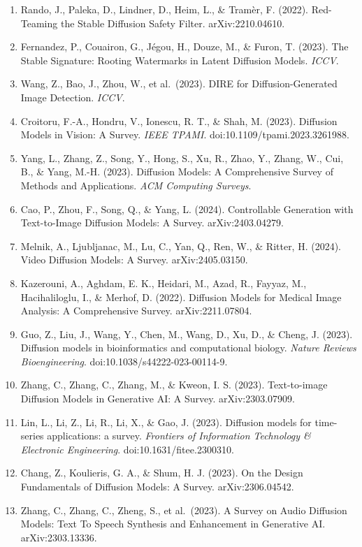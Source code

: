 \begin{enumerate}
\item
  Rando, J., Paleka, D., Lindner, D., Heim, L., \& Tramèr, F. (2022). Red-Teaming the Stable Diffusion Safety Filter. arXiv:2210.04610.
\item
  Fernandez, P., Couairon, G., Jégou, H., Douze, M., \& Furon, T. (2023). The Stable Signature: Rooting Watermarks in Latent Diffusion Models. \emph{ICCV}.
\item
  Wang, Z., Bao, J., Zhou, W., et al.~(2023). DIRE for Diffusion-Generated Image Detection. \emph{ICCV}.
\item
  Croitoru, F.-A., Hondru, V., Ionescu, R. T., \& Shah, M. (2023). Diffusion Models in Vision: A Survey. \emph{IEEE TPAMI}. doi:10.1109/tpami.2023.3261988.
\item
  Yang, L., Zhang, Z., Song, Y., Hong, S., Xu, R., Zhao, Y., Zhang, W., Cui, B., \& Yang, M.-H. (2023). Diffusion Models: A Comprehensive Survey of Methods and Applications. \emph{ACM Computing Surveys}.
\item
  Cao, P., Zhou, F., Song, Q., \& Yang, L. (2024). Controllable Generation with Text-to-Image Diffusion Models: A Survey. arXiv:2403.04279.
\item
  Melnik, A., Ljubljanac, M., Lu, C., Yan, Q., Ren, W., \& Ritter, H. (2024). Video Diffusion Models: A Survey. arXiv:2405.03150.
\item
  Kazerouni, A., Aghdam, E. K., Heidari, M., Azad, R., Fayyaz, M., Hacihaliloglu, I., \& Merhof, D. (2022). Diffusion Models for Medical Image Analysis: A Comprehensive Survey. arXiv:2211.07804.
\item
  Guo, Z., Liu, J., Wang, Y., Chen, M., Wang, D., Xu, D., \& Cheng, J. (2023). Diffusion models in bioinformatics and computational biology. \emph{Nature Reviews Bioengineering}. doi:10.1038/s44222-023-00114-9.
\item
  Zhang, C., Zhang, C., Zhang, M., \& Kweon, I. S. (2023). Text-to-image Diffusion Models in Generative AI: A Survey. arXiv:2303.07909.
\item
  Lin, L., Li, Z., Li, R., Li, X., \& Gao, J. (2023). Diffusion models for time-series applications: a survey. \emph{Frontiers of Information Technology \& Electronic Engineering}. doi:10.1631/fitee.2300310.
\item
  Chang, Z., Koulieris, G. A., \& Shum, H. J. (2023). On the Design Fundamentals of Diffusion Models: A Survey. arXiv:2306.04542.
\item
  Zhang, C., Zhang, C., Zheng, S., et al.~(2023). A Survey on Audio Diffusion Models: Text To Speech Synthesis and Enhancement in Generative AI. arXiv:2303.13336.

\end{enumerate}
